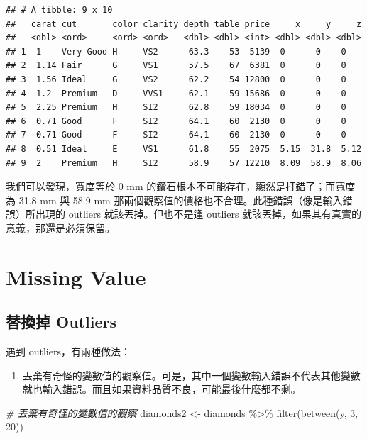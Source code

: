 \documentclass[
]{book}
\newenvironment{Shaded}{\begin{snugshade}}{\end{snugshade}}
\newcommand{\CommentTok}[1]{\textcolor[rgb]{0.56,0.35,0.01}{\textit{#1}}}
\newcommand{\DecValTok}[1]{\textcolor[rgb]{0.00,0.00,0.81}{#1}}
\newcommand{\FunctionTok}[1]{\textcolor[rgb]{0.00,0.00,0.00}{#1}}
\newcommand{\NormalTok}[1]{#1}
\newcommand{\OtherTok}[1]{\textcolor[rgb]{0.56,0.35,0.01}{#1}}
\newcommand{\SpecialCharTok}[1]{\textcolor[rgb]{0.00,0.00,0.00}{#1}}
\providecommand{\tightlist}{%
  \setlength{\itemsep}{0pt}\setlength{\parskip}{0pt}}
\theoremstyle{definition}
\theoremstyle{remark}
\begin{document}
\begin{verbatim}
## # A tibble: 9 x 10
##   carat cut       color clarity depth table price     x     y     z
##   <dbl> <ord>     <ord> <ord>   <dbl> <dbl> <int> <dbl> <dbl> <dbl>
## 1  1    Very Good H     VS2      63.3    53  5139  0      0    0   
## 2  1.14 Fair      G     VS1      57.5    67  6381  0      0    0   
## 3  1.56 Ideal     G     VS2      62.2    54 12800  0      0    0   
## 4  1.2  Premium   D     VVS1     62.1    59 15686  0      0    0   
## 5  2.25 Premium   H     SI2      62.8    59 18034  0      0    0   
## 6  0.71 Good      F     SI2      64.1    60  2130  0      0    0   
## 7  0.71 Good      F     SI2      64.1    60  2130  0      0    0   
## 8  0.51 Ideal     E     VS1      61.8    55  2075  5.15  31.8  5.12
## 9  2    Premium   H     SI2      58.9    57 12210  8.09  58.9  8.06
\end{verbatim}

我們可以發現，寬度等於 0 mm 的鑽石根本不可能存在，顯然是打錯了；而寬度為 31.8 mm 與 58.9 mm 那兩個觀察值的價格也不合理。此種錯誤（像是輸入錯誤）所出現的 outliers 就該丟掉。但也不是逢 outliers 就該丟掉，如果其有真實的意義，那還是必須保留。

\hypertarget{missing-value}{%
\section{Missing Value}\label{missing-value}}

\hypertarget{ux66ffux63dbux6389-outliers}{%
\subsection{替換掉 Outliers}\label{ux66ffux63dbux6389-outliers}}

遇到 outliers，有兩種做法：

\begin{enumerate}
\def\labelenumi{\arabic{enumi}.}
\tightlist
\item
  丟棄有奇怪的變數值的觀察值。可是，其中一個變數輸入錯誤不代表其他變數就也輸入錯誤。而且如果資料品質不良，可能最後什麼都不剩。
\end{enumerate}

\begin{Shaded}
\begin{Highlighting}[]
\CommentTok{\# 丟棄有奇怪的變數值的觀察}
\NormalTok{diamonds2 }\OtherTok{\textless{}{-}}\NormalTok{ diamonds }\SpecialCharTok{\%\textgreater{}\%}
  \FunctionTok{filter}\NormalTok{(}\FunctionTok{between}\NormalTok{(y, }\DecValTok{3}\NormalTok{, }\DecValTok{20}\NormalTok{))}
\end{Highlighting}
\end{Shaded}
\end{document}
